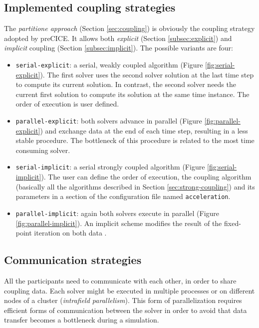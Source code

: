 \subsection{Implemented coupling strategies}
\label{sec:pc-coupling}

The \textit{partitione approach} (Section \ref{sec:coupling}) is obviously the coupling strategy adopted by preCICE. It allows both \textit{explicit} (Section \ref{subsec:explicit}) and \textit{implicit} coupling (Section \ref{subsec:implicit}). The possible variants are four:

\begin{itemize}
	\item \texttt{serial-explicit}: a serial, weakly coupled algorithm (Figure \ref{fig:serial-explicit}). The first solver uses the second solver solution at the last time step to compute its current solution. In contrast, the second solver needs the current first solution to compute its solution at the same time instance. The order of execution is user defined.
	\item \texttt{parallel-explicit}: both solvers advance in parallel (Figure \ref{fig:parallel-explicit}) and exchange data at the end of each time step, resulting in a less stable procedure. The bottleneck of this procedure is related to the most time consuming solver.
	\item \texttt{serial-implicit}: a serial strongly coupled algorithm (Figure \ref{fig:serial-implicit}). The user can define the order of execution, the coupling algorithm (basically all the algorithms described in Section \ref{sec:strong-coupling}) and its parameters in a section of the configuration file named \texttt{acceleration}.
	\item \texttt{parallel-implicit}: again both solvers execute in parallel (Figure \ref{fig:parallel-implicit}). An implicit scheme modifies the result of the fixed-point iteration on both data \cite{mehl2016parallel}. 
\end{itemize}



\subsection{Communication strategies}
\label{sec:pc-comm}

All the participants need to communicate with each other, in order to share coupling data.
Each solver might be executed in multiple processes or on different nodes of a cluster (\textit{intrafield parallelism}).
This form of parallelization requires efficient forms of communication between the solver in order to avoid that data transfer becomes a bottleneck during a simulation.

